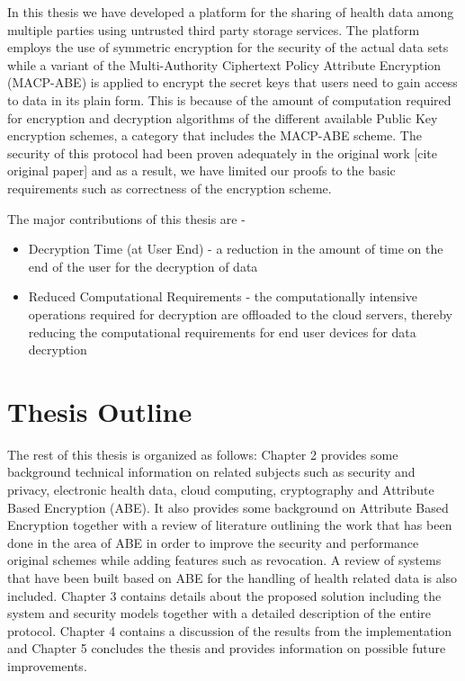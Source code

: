 In this thesis we have developed a platform for the sharing of health data among multiple parties using untrusted third party storage services. The platform employs the use of symmetric encryption for the security of the actual data sets while a variant of the Multi-Authority Ciphertext Policy Attribute Encryption (MACP-ABE) is applied to encrypt the secret keys that users need to gain access to data in its plain form. This is because of the amount of computation required for encryption and decryption algorithms of the different available Public Key encryption schemes, a category that includes the MACP-ABE scheme. The security of this protocol had been proven adequately in the original work [cite original paper] and as a result, we have limited our proofs to the basic requirements such as correctness of the encryption scheme.

The major contributions of this thesis are - 

\begin{itemize}
	
	\item Decryption Time (at User End) - a reduction in the amount of time on the end of the user for the decryption of data
	
	\item Reduced Computational Requirements - the computationally intensive operations required for decryption are offloaded to the cloud servers, thereby reducing the computational requirements for end user devices for data decryption
	
\end{itemize}

\section{Thesis Outline}

The rest of this thesis is organized as follows: Chapter 2 provides some background technical information on related subjects such as security and privacy, electronic health data, cloud computing, cryptography and Attribute Based Encryption (ABE). It also provides some background on Attribute Based Encryption together with a review of literature outlining the work that has been done in the area of ABE in order to improve the security and performance original schemes while adding features such as revocation. A review of systems that have been built based on ABE for the handling of health related data is also included. Chapter 3 contains details about the proposed solution including the system and security models together with a detailed description of the entire protocol. Chapter 4 contains a discussion of the results from the implementation and Chapter 5 concludes the thesis and provides information on possible future improvements.

